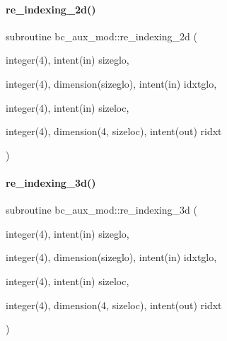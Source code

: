 \mbox{\label{namespacebc__aux__mod_a4007772a42498f64a755720d6ef86c6c}} 
\paragraph{\texorpdfstring{re\+\_\+indexing\+\_\+2d()}{re\_indexing\_2d()}}
{\footnotesize\ttfamily subroutine bc\+\_\+aux\+\_\+mod\+::re\+\_\+indexing\+\_\+2d (\begin{DoxyParamCaption}\item[{integer(4), intent(in)}]{sizeglo,  }\item[{integer(4), dimension(sizeglo), intent(in)}]{idxtglo,  }\item[{integer(4), intent(in)}]{sizeloc,  }\item[{integer(4), dimension(4, sizeloc), intent(out)}]{ridxt }\end{DoxyParamCaption})}

\mbox{\label{namespacebc__aux__mod_ab96eacd816b887e1ed257e11c342b7c6}} 
\paragraph{\texorpdfstring{re\+\_\+indexing\+\_\+3d()}{re\_indexing\_3d()}}
{\footnotesize\ttfamily subroutine bc\+\_\+aux\+\_\+mod\+::re\+\_\+indexing\+\_\+3d (\begin{DoxyParamCaption}\item[{integer(4), intent(in)}]{sizeglo,  }\item[{integer(4), dimension(sizeglo), intent(in)}]{idxtglo,  }\item[{integer(4), intent(in)}]{sizeloc,  }\item[{integer(4), dimension(4, sizeloc), intent(out)}]{ridxt }\end{DoxyParamCaption})}

\mbox{\label{namespacebc__aux__mod_a1d34b587fdb3cda345dfbe1f8520a4a3}} 
